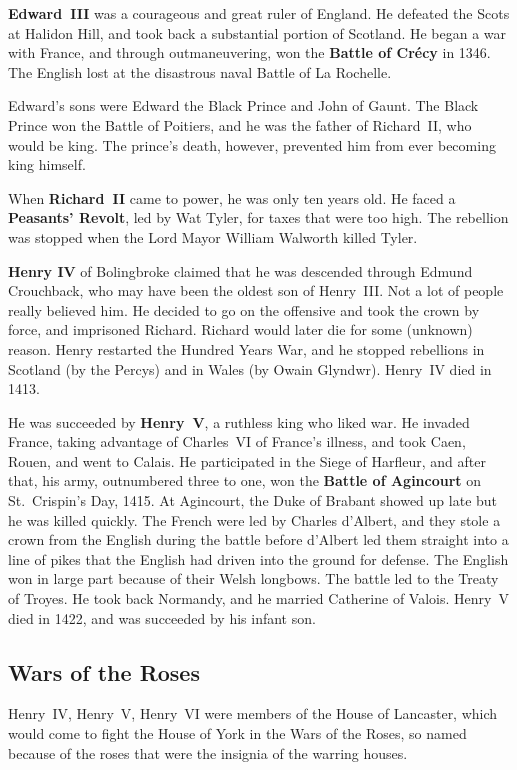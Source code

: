 \textbf{Edward~III} was a courageous and great ruler of England.
He defeated the Scots at Halidon Hill, and took back a substantial portion of Scotland.
He began a war with France, and through outmaneuvering, won the \textbf{Battle of Cr\'ecy} in 1346.
The English lost at the disastrous naval Battle of La Rochelle.

Edward's sons were Edward the Black Prince and John of Gaunt.
The Black Prince won the Battle of Poitiers, and he was the father of Richard~II, who would be king.
The prince's death, however, prevented him from ever becoming king himself.

When \textbf{Richard~II} came to power, he was only ten years old.
He faced a \textbf{Peasants' Revolt}, led by Wat Tyler, for taxes that were too high.
The rebellion was stopped when the Lord Mayor William Walworth killed Tyler.

\textbf{Henry IV} of Bolingbroke claimed that he was descended through Edmund Crouchback,
who may have been the oldest son of Henry~III\@.
Not a lot of people really believed him.
He decided to go on the offensive and took the crown by force, and imprisoned Richard.
Richard would later die for some (unknown) reason.
Henry restarted the Hundred Years War, and he stopped rebellions
in Scotland (by the Percys) and in Wales (by Owain Glyndwr).
Henry~IV died in 1413.

He was succeeded by \textbf{Henry~V}, a ruthless king who liked war.
He invaded France, taking advantage of Charles~VI of France's illness,
and took Caen, Rouen, and went to Calais.
He participated in the Siege of Harfleur, and after that,
his army, outnumbered three to one, won the \textbf{Battle of Agincourt} on St.\ Crispin's Day, 1415.
At Agincourt, the Duke of Brabant showed up late but he was killed quickly.
The French were led by Charles d'Albert, and they stole a crown from the English during the battle
before d'Albert led them straight into a line of pikes that the English had driven into the ground for defense.
The English won in large part because of their Welsh longbows.
The battle led to the Treaty of Troyes.
He took back Normandy, and he married Catherine of Valois.
Henry~V died in 1422, and was succeeded by his infant son.

\subsection*{Wars of the Roses}

Henry~IV, Henry~V, Henry~VI were members of the House of Lancaster,
which would come to fight the House of York in the Wars of the Roses,
so named because of the roses that were the insignia of the warring houses.

